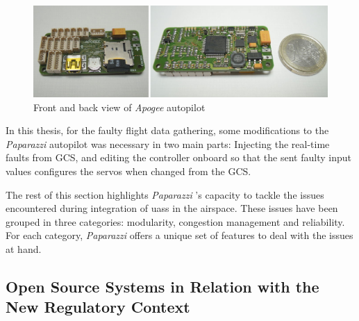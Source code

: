\begin{figure}
\begin{center}
\includegraphics[width=14cm]{figures/apogeePaparazzi}
\caption{Front and back view of \emph{Apogee} autopilot} 
\label{fig:apogeePaparazzi}
\end{center}
\end{figure}

In this thesis, for the faulty flight data gathering, some modifications to the \emph{Paparazzi} autopilot was necessary in two main parts: Injecting the real-time faults from GCS, and editing the controller onboard so that the sent faulty input values configures the servos when changed from the GCS. 

The rest of this section highlights \emph{Paparazzi} 's capacity to tackle the issues encountered during integration of \gls{uas}s in the airspace. These issues have been grouped in three categories: modularity, congestion management and reliability. For each category, \emph{Paparazzi} offers a unique set of features to deal with the issues at hand.

\subsection{Open Source Systems in Relation with the New Regulatory Context}

